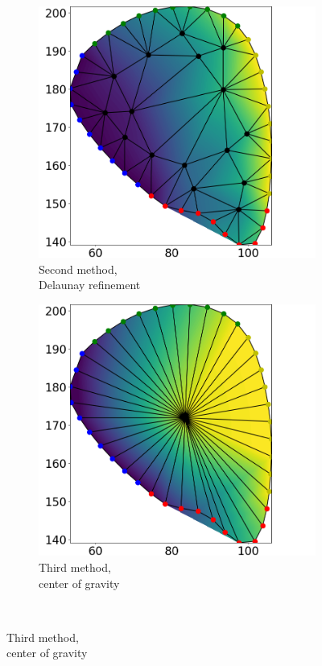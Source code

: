\begin{figure}
\begin{subfigure}[t]{0.31\textwidth}
    \includegraphics[width=\textwidth]{images/fiber_creation/u_1.png}%
    \caption{Second method,\\Delaunay refinement}%
    \label{fig:triu_1}%
  \end{subfigure}
  \quad
  \begin{subfigure}[t]{0.31\textwidth}%
    \centering%
    \includegraphics[width=\textwidth]{images/fiber_creation/u_2.png}%
    \caption{Third method,\\center of gravity}%
    \label{fig:triu_2}%
  \end{subfigure}\\
  

\end{figure}
